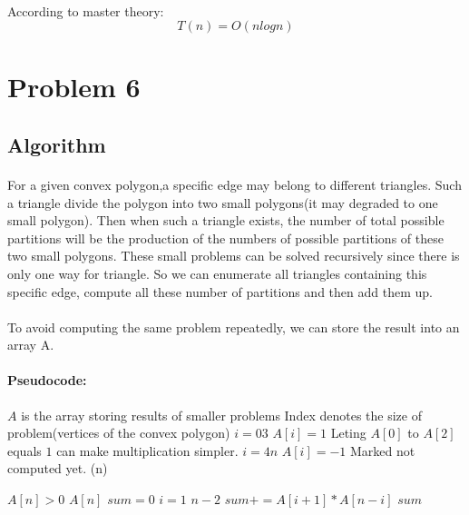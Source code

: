 \documentclass[]{article}
\begin{document}
            \paragraph{} According to master theory:
            \begin{equation*}
                T(n) = O(n log n)
            \end{equation*}
            
            
            
    \section{Problem 6}
        \subsection{Algorithm}
            \paragraph{} For a given convex polygon,a specific edge may belong to different triangles. Such a triangle divide the polygon into two small polygons(it may degraded to one small polygon). Then when such a triangle exists, the number of total possible partitions will be the production of the numbers of possible partitions of these two small polygons. These small problems can be solved recursively since there is only one way for triangle. So we can enumerate all triangles containing this specific edge, compute all these number of partitions and then add them up.
            \paragraph{} To avoid computing the same problem repeatedly, we can store the result into an array A.
            \paragraph{Pseudocode:}
\begin{codebox}
\zi    \Comment $A$ is the array storing results of smaller problems
\zi    \Comment Index denotes the size of problem(vertices of the convex polygon)
\li    \For $i = 0$\To $3$ 
\li        \Do $A[i] = 1$ \Comment Leting $A[0]$ to $A[2]$ equals $1$ can make multiplication simpler.
       \End
\li    \For $i = 4$\To $n$ 
\li        \Do $A[i] = -1$ \Comment Marked not computed yet.
       \End
\li    \Return {}(n)   
\end{codebox}
\begin{codebox}
\li    \If $A[n] > 0$ 
\li        \Then \Return $A[n]$
\li    \Else
\li        $sum = 0$
\li        \For $i = 1$ \To $n-2$
\li            \Do $sum+=A[i+1] * A[n-i]$ \label{Count-Formular:summing}
           \End
       \End
\li    \Return $sum$

\end{codebox}
\end{document}

